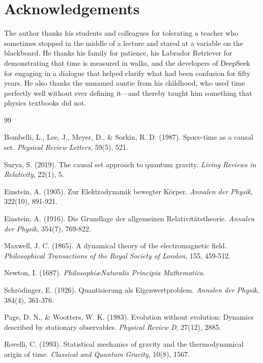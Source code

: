 \documentclass[12pt, a4paper]{article}
\begin{document}
\section*{Acknowledgements}

The author thanks his students and colleagues for tolerating a teacher who sometimes stopped in the middle of a lecture and stared at a variable on the blackboard. He thanks his family for patience, his Labrador Retriever for demonstrating that time is measured in walks, and the developers of DeepSeek for engaging in a dialogue that helped clarify what had been confusion for fifty years. He also thanks the unnamed auntie from his childhood, who used time perfectly well without ever defining it---and thereby taught him something that physics textbooks did not.

\begin{thebibliography}{99}

Bombelli, L., Lee, J., Meyer, D., \& Sorkin, R. D. (1987). Space-time as a causal set. \textit{Physical Review Letters}, 59(5), 521.

Surya, S. (2019). The causal set approach to quantum gravity. \textit{Living Reviews in Relativity}, 22(1), 5.

Einstein, A. (1905). Zur Elektrodynamik bewegter K\"orper. \textit{Annalen der Physik}, 322(10), 891-921.

Einstein, A. (1916). Die Grundlage der allgemeinen Relativit\"atstheorie. \textit{Annalen der Physik}, 354(7), 769-822.

Maxwell, J. C. (1865). A dynamical theory of the electromagnetic field. \textit{Philosophical Transactions of the Royal Society of London}, 155, 459-512.

Newton, I. (1687). \textit{Philosophi\ae Naturalis Principia Mathematica.}

Schr\"odinger, E. (1926). Quantisierung als Eigenwertproblem. \textit{Annalen der Physik}, 384(4), 361-376.

Page, D. N., \& Wootters, W. K. (1983). Evolution without evolution: Dynamics described by stationary observables. \textit{Physical Review D}, 27(12), 2885.

Rovelli, C. (1993). Statistical mechanics of gravity and the thermodynamical origin of time. \textit{Classical and Quantum Gravity}, 10(8), 1567.


\end{thebibliography}
\end{document}
